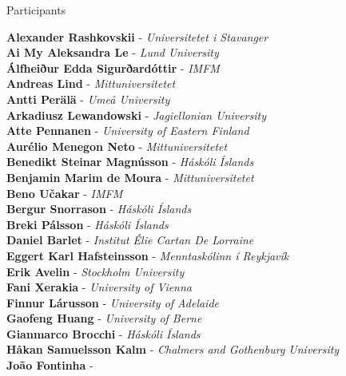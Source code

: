 \documentclass[12pt, openany, twoside]{report}      %
\begin{document}



\pagebreak



\pagebreak





\newpage
{}

\noindent
{\LARGE Participants}

\bigskip
\bigskip
\noindent
\textbf{Alexander Rashkovskii} -
\textit{Universitetet i Stavanger}
\\
\textbf{Ai My Aleksandra Le} -
\textit{Lund University}
\\
\textbf{Álfheiður Edda Sigurðardóttir} -
\textit{IMFM}
\\
\textbf{Andreas Lind} -
\textit{Mittuniversitetet}
\\
\textbf{Antti Perälä} -
\textit{Umeå University}
\\
\textbf{Arkadiusz Lewandowski} -
\textit{Jagiellonian University}
\\
\textbf{Atte Pennanen} -
\textit{University of Eastern Finland}
\\
\textbf{Aurélio Menegon Neto} -
\textit{Mittuniversitetet}
\\
\textbf{Benedikt Steinar Magnússon} -
\textit{Háskóli Íslands}
\\
\textbf{Benjamin Marim de Moura} -
\textit{Mittuniversitetet}
\\
\textbf{Beno Učakar} -
\textit{IMFM}
\\
\textbf{Bergur Snorrason} -
\textit{Háskóli Íslands}
\\
\textbf{Breki Pálsson} -
\textit{Háskóli Íslands}
\\
\textbf{Daniel Barlet} -
\textit{Institut Élie Cartan De Lorraine}
\\
\textbf{Eggert Karl Hafsteinsson} -
\textit{Menntaskólinn í Reykjavík}
\\
\textbf{Erik Avelin} -
\textit{Stockholm University}
\\
\textbf{Fani Xerakia} -
\textit{University of Vienna}
\\
\textbf{Finnur Lárusson} -
\textit{University of Adelaide}
\\
\textbf{Gaofeng Huang} -
\textit{University of Berne}
\\
\textbf{Gianmarco Brocchi} -
\textit{Háskóli Íslands}
\\
\textbf{Håkan Samuelsson Kalm} -
\textit{Chalmers and Gothenburg University}
\\
\textbf{João Fontinha} -
\end{document}
